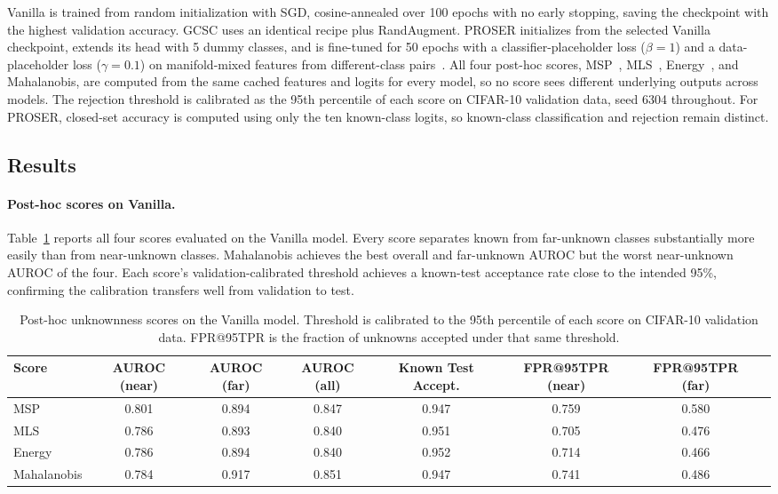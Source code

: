 \documentclass{article}
\begin{document}
Vanilla is trained from random initialization with SGD, cosine-annealed over 100 epochs with no early stopping, saving the checkpoint with the highest validation accuracy. GCSC uses an identical recipe plus RandAugment. PROSER initializes from the selected Vanilla checkpoint, extends its head with 5 dummy classes, and is fine-tuned for 50 epochs with a classifier-placeholder loss ($\beta=1$) and a data-placeholder loss ($\gamma=0.1$) on manifold-mixed features from different-class pairs~\citep{zhou2021proser}. All four post-hoc scores, MSP~\citep{hendrycks2017msp}, MLS~\citep{vaze2022osr}, Energy~\citep{liu2020energy}, and Mahalanobis, are computed from the same cached features and logits for every model, so no score sees different underlying outputs across models. The rejection threshold is calibrated as the 95th percentile of each score on CIFAR-10 validation data, seed 6304 throughout. For PROSER, closed-set accuracy is computed using only the ten known-class logits, so known-class classification and rejection remain distinct.

\subsection{Results}

\paragraph{Post-hoc scores on Vanilla.}
Table~\ref{tab:t4-scores} reports all four scores evaluated on the Vanilla model. Every score separates known from far-unknown classes substantially more easily than from near-unknown classes. Mahalanobis achieves the best overall and far-unknown AUROC but the worst near-unknown AUROC of the four. Each score's validation-calibrated threshold achieves a known-test acceptance rate close to the intended 95\%, confirming the calibration transfers well from validation to test.

\begin{table}[t]
  \caption{Post-hoc unknownness scores on the Vanilla model. Threshold is calibrated to the 95th percentile of each score on CIFAR-10 validation data. FPR@95TPR is the fraction of unknowns accepted under that same threshold.}
  \label{tab:t4-scores}
  \centering
  \footnotesize
  \begin{tabular}{lccccccc}
    \toprule
    Score & AUROC (near) & AUROC (far) & AUROC (all) & Known Test Accept. & FPR@95TPR (near) & FPR@95TPR (far) \\
    \midrule
    MSP         & 0.801 & 0.894 & 0.847 & 0.947  & 0.759 & 0.580 \\
    MLS         & 0.786 & 0.893 & 0.840 & 0.951  & 0.705 & 0.476 \\
    Energy      & 0.786 & 0.894 & 0.840 & 0.952  & 0.714 & 0.466 \\
    Mahalanobis & 0.784 & 0.917 & 0.851 & 0.947  & 0.741 & 0.486 \\
    \bottomrule
  \end{tabular}
\end{table}
\end{document}

